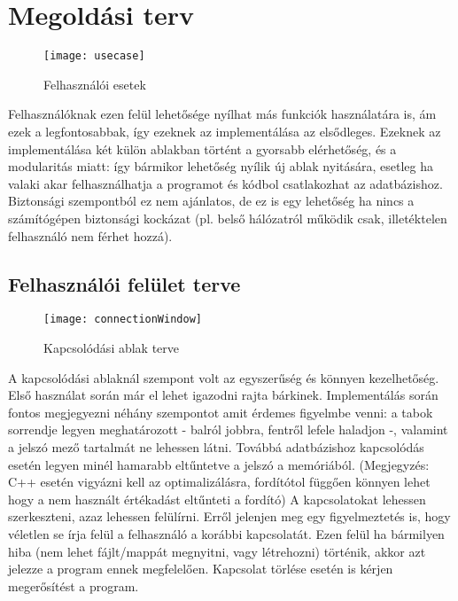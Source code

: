 \section{Megoldási terv}

\begin{figure}[ht]
  \begin{center}
  \texttt{[image: usecase]}
  \end{center}
 \caption{Felhasználói esetek}
\end{figure}

Felhasználóknak ezen felül lehetősége nyílhat más funkciók használatára is,
ám ezek a legfontosabbak, így ezeknek az implementálása az elsődleges.
Ezeknek az implementálása két külön ablakban történt a gyorsabb elérhetőség, és
a modularitás miatt: így bármikor lehetőség nyílik új ablak nyitására, esetleg
ha valaki akar felhasználhatja a programot és kódbol csatlakozhat az adatbázishoz.
Biztonsági szempontból ez nem ajánlatos, de ez is egy lehetőség ha nincs a számítógépen
biztonsági kockázat (pl. belső hálózatról működik csak, illetéktelen felhasználó nem férhet hozzá).

\subsection{Felhasználói felület terve}
\begin{figure}[ht]
  \begin{center}
  \texttt{[image: connectionWindow]}
  \end{center}
 \caption{Kapcsolódási ablak terve}
\end{figure}

A kapcsolódási ablaknál szempont volt az egyszerűség és könnyen kezelhetőség. Első használat
során már el lehet igazodni rajta bárkinek. Implementálás során fontos megjegyezni néhány szempontot
amit érdemes figyelmbe venni: a tabok sorrendje legyen meghatározott - balról jobbra, fentről lefele haladjon -, valamint
a jelszó mező tartalmát ne lehessen látni. Továbbá adatbázishoz kapcsolódás esetén legyen minél hamarabb eltűntetve a
jelszó a memóriából. (Megjegyzés: C++ esetén vigyázni kell az optimalizálásra, fordítótol függően könnyen lehet hogy a nem használt értékadást
eltűnteti a fordító) A kapcsolatokat lehessen szerkeszteni, azaz lehessen felülírni. Erről jelenjen meg egy figyelmeztetés is,
hogy véletlen se írja felül a felhasználó a korábbi kapcsolatát. Ezen felül ha bármilyen hiba (nem lehet fájlt/mappát megnyitni, vagy létrehozni)
történik, akkor azt jelezze a program ennek megfelelően. Kapcsolat törlése esetén is kérjen megerősítést a program.

